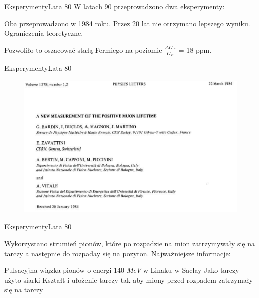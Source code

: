 \documentclass[xcolor={dvipsnames}]{beamer}
\begin{document}
\begin{frame}{Eksperymenty}{Lata 80}
    W latach 90 przeprowadzono dwa eksperymenty:

    \begin{outline}[enumerate]
        \1 Oba przeprowadzono w 1984 roku.
        \1 Przez 20 lat nie otrzymano lepszego wyniku.
        \1 Ograniczenia teoretyczne.

    \end{outline}

    Pozwoliło to oszacować stałą Fermiego na poziomie $\frac{\Delta G_F}{G_F}$ = 18 ppm.

\end{frame}

\begin{frame}{Eksperymenty}{Lata 80}

    \begin{figure}
        \includegraphics[scale=0.7]{positive1_bardin.PNG}

    \end{figure}

\end{frame}

\begin{frame}{Eksperymenty}{Lata 80}

    Wykorzystano strumień pionów, które po rozpadzie na mion zatrzymywały się na tarczy a następnie do rozpaday się na pozyton. Najważniejsze informacje:
    
    \begin{outline}[enumerate]
        \1 Pulsacyjna wiązka pionów o energi 140 $MeV$ w Linaku w Saclay
        \1 Jako tarczy użyto siarki
        \1 Kształt i ułożenie tarczy tak aby miony przed rozpadem zatrzymały się na tarczy
    \end{outline}

\end{frame}
\end{document}
